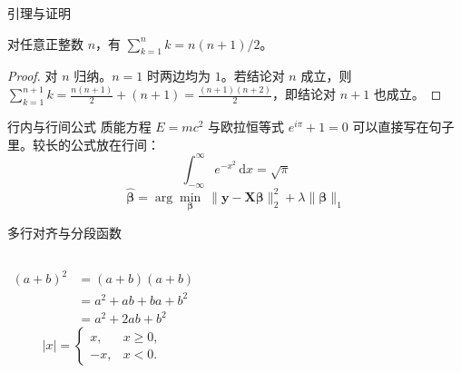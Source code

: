 \documentclass[aspectratio=169,10pt]{beamer}
\begin{document}
\begin{frame}{引理与证明}
  \footnotesize
  \begin{lemma}
    对任意正整数 $n$，有 $\sum_{k=1}^{n} k = n(n+1)/2$。
  \end{lemma}
  \begin{proof}
    对 $n$ 归纳。$n = 1$ 时两边均为 $1$。若结论对 $n$ 成立，则
    $\sum_{k=1}^{n+1} k = \frac{n(n+1)}{2} + (n+1) = \frac{(n+1)(n+2)}{2}$，即结论对 $n+1$ 也成立。
  \end{proof}
\end{frame}


\begin{frame}{行内与行间公式}
  \small
  质能方程 $E = mc^2$ 与欧拉恒等式 $e^{i\pi} + 1 = 0$ 可以直接写在句子里。较长的公式放在行间：
  \begin{equation}
    \int_{-\infty}^{\infty} e^{-x^2}\,\mathrm{d}x = \sqrt{\pi}
  \end{equation}
  \begin{equation}
    \hat{\bm{\beta}} = \arg\min_{\bm{\beta}} \; \lVert \bm{y} - \bm{X}\bm{\beta} \rVert_2^2 + \lambda \lVert \bm{\beta} \rVert_1
  \end{equation}
\end{frame}

\begin{frame}{多行对齐与分段函数}
  \small
  \begin{columns}[T,onlytextwidth]
      \begin{align}
        (a+b)^2 &= (a+b)(a+b) \\
                &= a^2 + ab + ba + b^2 \\
                &= a^2 + 2ab + b^2
      \end{align}
      \begin{equation}
        |x| =
        \begin{cases}
          x,  & x \ge 0, \\
          -x, & x < 0.
        \end{cases}
      \end{equation}
  \end{columns}
\end{frame}
\end{document}
